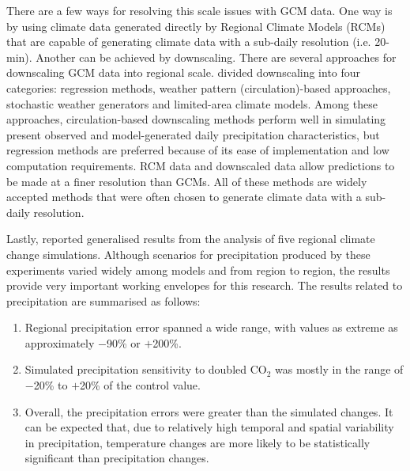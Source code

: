 There are a few ways for resolving this scale issues with GCM data. One way is
by using climate data generated directly by Regional Climate Models (RCMs) that
are capable of generating climate data with a sub-daily resolution (i.e.
20-min). Another can be achieved by downscaling. There are several approaches
for downscaling GCM data into regional scale. \citet{wilby1997-530} divided
downscaling into four categories: regression methods, weather pattern
(circulation)-based approaches, stochastic weather generators and limited-area
climate models. Among these approaches, circulation-based downscaling methods
perform well in simulating present observed and model-generated daily
precipitation characteristics, but regression methods are preferred because of
its ease of implementation and low computation requirements. RCM data and
downscaled data allow predictions to be made at a finer resolution than GCMs. All of
these methods are widely accepted methods that were often chosen to generate
climate data with a sub-daily resolution.

Lastly, \citet{ipcc2001-1032} reported generalised results from the analysis
of five regional climate change simulations. Although scenarios for
precipitation produced by these experiments varied widely among models and from
region to region, the results provide very important working envelopes for this
research. The results related to precipitation are summarised as follows:
\begin{enumerate}
  \item Regional precipitation error spanned a wide range, with values as
extreme as approximately $-$90\% or $+$200\%.
  \item Simulated precipitation sensitivity to doubled CO$_2$ was mostly
in the range of $-$20\% to $+$20\% of the control value.
  \item Overall, the precipitation errors were greater than the simulated
changes. It can be expected that, due to relatively high temporal and spatial
variability in precipitation, temperature changes are more likely to be
statistically significant than precipitation changes.
\end{enumerate}
